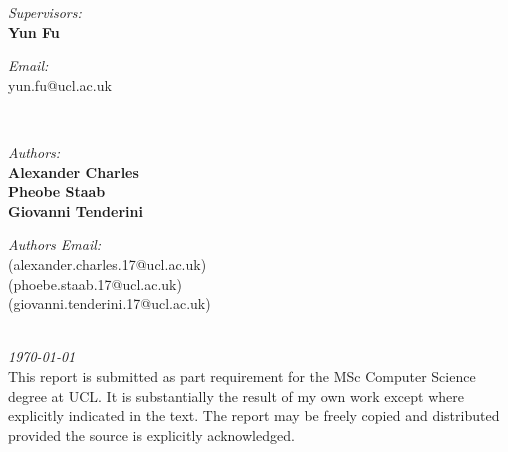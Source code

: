 \documentclass[fontsize=10pt]{extarticle}
\makeatletter
\numberwithin{figure}{section} %
\newcommand{\StudentNameA}{Alexander Charles}
\newcommand{\StudentNumberA}{alexander.charles.17@ucl.ac.uk}
\newcommand{\StudentNameC}{Giovanni Tenderini}
\newcommand{\StudentNumberC}{giovanni.tenderini.17@ucl.ac.uk}
\newcommand{\StudentNameB}{Pheobe Staab}
\newcommand{\StudentNumberB}{phoebe.staab.17@ucl.ac.uk}
\newcommand{\SupervisorNameA}{Yun Fu}
\newcommand{\SupervisorEmailA}{yun.fu@ucl.ac.uk}
\makeatother
\begin{document}
\begin{titlepage}
\begin{minipage}{0.4\textwidth}
  \begin{flushleft} \large
  \emph{Supervisors:}\\
  \textbf{\SupervisorNameA}\\
  \end{flushleft}
\end{minipage}\qquad
\begin{minipage}{0.4\textwidth}
  \begin{flushright} \large
  \emph{Email:} \\
  \SupervisorEmailA \\
  \end{flushright}
\end{minipage} \\[1cm]
\begin{minipage}{0.4\textwidth}
  \begin{flushleft} \large
  \emph{Authors:} \\
  	\textbf{\StudentNameA} \\
    \textbf{\StudentNameB} \\
    \textbf{\StudentNameC}
  \end{flushleft}
\end{minipage}\qquad
\begin{minipage}{0.4\textwidth}
  \begin{flushright} \large
     \emph{Authors Email:} \\
     (\StudentNumberA) \\
    (\StudentNumberB) \\
    (\StudentNumberC)
    \end{flushright}
\end{minipage}\\[1cm]

\textit{{\large \today}}\\[0.5cm]%

{\small This report is submitted as part requirement for the MSc Computer Science degree at UCL. It is substantially the result of my own work except where explicitly indicated in the text. The report may be freely copied and distributed provided the source is explicitly acknowledged.}

\vfill %
\end{titlepage}
\end{document}
